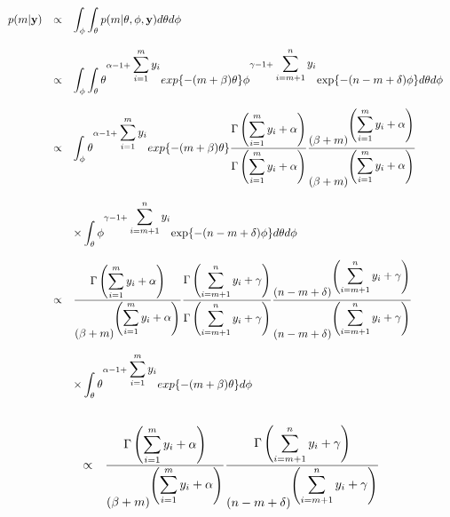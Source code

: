 \documentclass{article}
\begin{document}
\begin{equation*}
\begin{array}{lcl ll }
p(m|\textbf{y}) & \propto & \displaystyle\int_{\phi}\displaystyle\int_{\theta} p(m|\theta, \phi,\textbf{y})d\theta d\phi \\ \\

& \propto & \displaystyle\int_{\phi}\displaystyle\int_{\theta}\theta^{\alpha -1 + \displaystyle\sum_{i=1}^{m}{y_i}}exp\{-(m + \beta)\theta\}\phi^{\gamma -1 + \displaystyle\sum_{i=m+1}^{n}y_i}\mbox{exp}\{-(n-m + \delta)\phi\}d\theta d\phi \\ \\

& \propto & \displaystyle\int_{\phi}\theta^{\alpha -1 + \displaystyle\sum_{i=1}^{m}{y_i}}exp\{-(m + \beta)\theta\} \dfrac{\Gamma\left(\displaystyle\sum_{i=1}^{m}{y_i} + \alpha\right)}{\Gamma\left(\displaystyle\sum_{i=1}^{m}{y_i} + \alpha\right)}\dfrac{(\beta+m)^{\left(\displaystyle\sum_{i=1}^{m}{y_i} + \alpha\right)}}{(\beta+m)^{\left(\displaystyle\sum_{i=1}^{m}{y_i} + \alpha\right)}} \\ \\

&  & \times  \displaystyle\int_{\theta}\phi^{\gamma -1 + \displaystyle\sum_{i=m+1}^{n}y_i}\mbox{exp}\{-(n-m + \delta)\phi\}d\theta d\phi \\ \\

& \propto & \dfrac{\Gamma\left(\displaystyle\sum_{i=1}^{m}{y_i} + \alpha\right)}{(\beta+m)^{\left(\displaystyle\sum_{i=1}^{m}{y_i} + \alpha\right)}} \dfrac{\Gamma\left(\displaystyle\sum_{i=m+1}^{n}{y_i} + \gamma\right)}{\Gamma\left(\displaystyle\sum_{i=m+1}^{n}{y_i} + \gamma\right)}\dfrac{(n-m+\delta)^{\left(\displaystyle\sum_{i=m+1}^{n}{y_i} + \gamma\right)}}{(n-m+\delta)^{\left(\displaystyle\sum_{i=m+1}^{n}{y_i} + \gamma\right)}} \\ \\

& & \times \displaystyle\int_{\theta}\theta^{\alpha -1 + \displaystyle\sum_{i=1}^{m}{y_i}}exp\{-(m + \beta)\theta\} d\phi \\ \\

 \end{array}
\end{equation*}

\begin{equation*}
\begin{array}{lcl ll }

& \propto & \dfrac{\Gamma\left(\displaystyle\sum_{i=1}^{m}{y_i} + \alpha\right)}{(\beta+m)^{\left(\displaystyle\sum_{i=1}^{m}{y_i} + \alpha\right)}} \dfrac{\Gamma\left(\displaystyle\sum_{i=m+1}^{n}{y_i} + \gamma\right)}{(n-m+\delta)^{\left(\displaystyle\sum_{i=m+1}^{n}{y_i} + \gamma\right)}} \\  \\

 \end{array}
\end{equation*}
\end{document}
